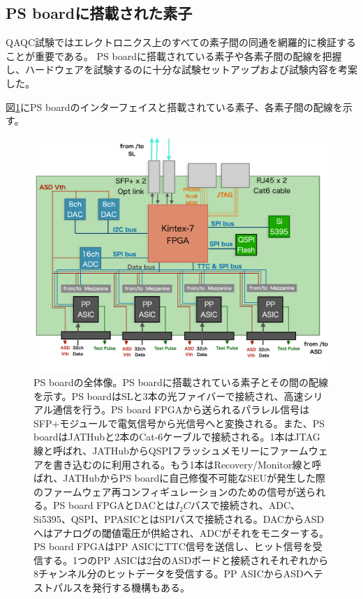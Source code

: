 \newpage
\subsection{PS boardに搭載された素子}
\label{subsec_PSBelements}
QAQC試験ではエレクトロニクス上のすべての素子間の同通を網羅的に検証することが重要である。
PS boardに搭載されている素子や各素子間の配線を把握し、ハードウェアを試験するのに十分な試験セットアップおよび試験内容を考案した。

図\ref{PSBconcept}にPS boardのインターフェイスと搭載されている素子、各素子間の配線を示す。

\begin{figure} 
\centering
\includegraphics[width=16cm]{fig/QAQC/PSBoverall.png}
\caption[PSboardの全体像]{PS boardの全体像。PS boardに搭載されている素子とその間の配線を示す。PS boardはSLと3本の光ファイバーで接続され、高速シリアル通信を行う。PS board FPGAから送られるパラレル信号はSFP+モジュールで電気信号から光信号へと変換される。また、PS boardはJATHubと2本のCat-6ケーブルで接続される。1本はJTAG線と呼ばれ、JATHubからQSPIフラッシュメモリーにファームウェアを書き込むのに利用される。もう1本はRecovery/Monitor線と呼ばれ、JATHubからPS boardに自己修復不可能なSEUが発生した際のファームウェア再コンフィギュレーションのための信号が送られる。PS board FPGAとDACとは$I_{2}C$バスで接続され、ADC、Si5395、QSPI、PPASICとはSPIバスで接続される。DACからASDへはアナログの閾値電圧が供給され、ADCがそれをモニターする。PS board FPGAはPP ASICにTTC信号を送信し、ヒット信号を受信する。1つのPP ASICは2台のASDボードと接続されそれぞれから8チャンネル分のヒットデータを受信する。PP ASICからASDへテストパルスを発行する機構もある。}
\label{PSBconcept}
\end{figure}

